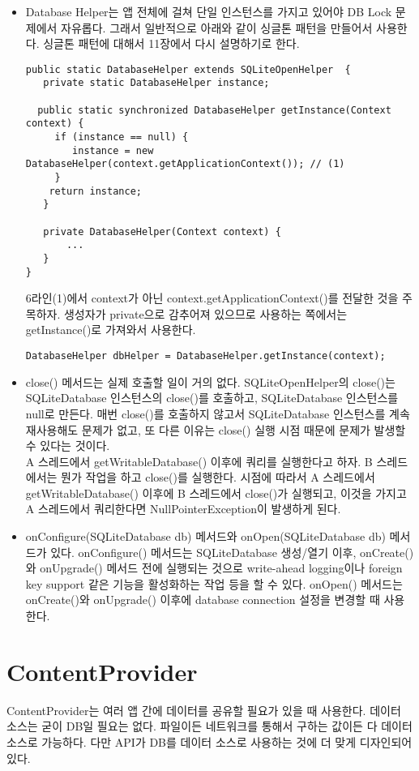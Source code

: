 \begin{itemize}
\item Database Helper는 앱 전체에 걸쳐 단일 인스턴스를 가지고 있어야 DB Lock 문제에서 자유롭다. 
그래서 일반적으로 아래와 같이 싱글톤 패턴을 만들어서 사용한다. 싱글톤 패턴에 대해서 11장에서 다시 설명하기로 한다.
\begin{lstlisting}[frame=single] 
public static DatabaseHelper extends SQLiteOpenHelper  {
   private static DatabaseHelper instance;
 
  public static synchronized DatabaseHelper getInstance(Context context) {
     if (instance == null) {
        instance = new DatabaseHelper(context.getApplicationContext()); // (1)
     }
    return instance;
   }
 
   private DatabaseHelper(Context context) {
       ...
   }
}
\end{lstlisting}
6라인(1)에서 context가 아닌 context.getApplicationContext()를 전달한 것을 주목하자.
생성자가 private으로 감추어져 있으므로 사용하는 쪽에서는 getInstance()로 가져와서 사용한다.
\begin{lstlisting}[frame=single] 
DatabaseHelper dbHelper = DatabaseHelper.getInstance(context);
\end{lstlisting}

\item close() 메서드는 실제 호출할 일이 거의 없다.
SQLiteOpenHelper의 close()는 SQLiteDatabase 인스턴스의 close()를 호출하고, SQLiteDatabase 인스턴스를 null로 만든다. 
매번 close()를 호출하지 않고서 SQLiteDatabase 인스턴스를 계속 재사용해도 문제가 없고, 또 다른 이유는 close() 실행 시점 때문에 문제가 발생할 수 있다는 것이다.\\

A 스레드에서 getWritableDatabase() 이후에 쿼리를 실행한다고 하자. B 스레드에서는 뭔가 작업을 하고 close()를 실행한다. 시점에 따라서 A 스레드에서 getWritableDatabase() 이후에 B 스레드에서 close()가 실행되고, 이것을 가지고 A 스레드에서 쿼리한다면  NullPointerException이 발생하게 된다. 
\item onConfigure(SQLiteDatabase db) 메서드와 onOpen(SQLiteDatabase db) 메서드가 있다. onConfigure() 메서드는 SQLiteDatabase 생성/열기 이후, onCreate()와 onUpgrade() 메서드 전에 실행되는 것으로 write-ahead logging이나 foreign key support 같은 기능을 활성화하는 작업 등을 할 수 있다. onOpen() 메서드는 onCreate()와 onUpgrade() 이후에 database connection 설정을 변경할 때 사용한다.

\end{itemize}

\section{ContentProvider}
ContentProvider는 여러 앱 간에 데이터를 공유할 필요가 있을 때 사용한다. 데이터 소스는 굳이 DB일 필요는 없다. 
파일이든 네트워크를 통해서 구하는 값이든 다 데이터 소스로 가능하다. 다만 API가 DB를 데이터 소스로 사용하는 것에 더 맞게 디자인되어 있다.\\

